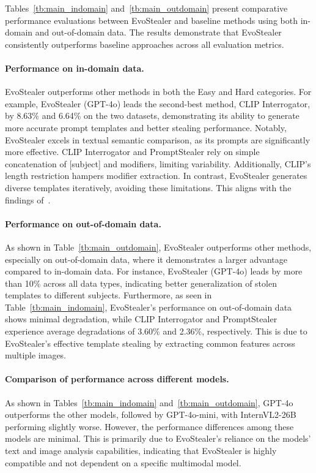 Tables~\ref{tb:main_indomain} and~\ref{tb:main_outdomain} present comparative performance evaluations between EvoStealer and baseline methods using both in-domain and out-of-domain data. The results demonstrate that EvoStealer consistently outperforms baseline approaches across all evaluation metrics.

\paragraph{Performance on in-domain data.} EvoStealer outperforms other methods in both the Easy and Hard categories. For example, EvoStealer (GPT-4o) leads the second-best method, CLIP Interrogator, by 8.63\% and 6.64\% on the two datasets, demonstrating its ability to generate more accurate prompt templates and better stealing performance. Notably, EvoStealer excels in textual semantic comparison, as its prompts are significantly more effective. CLIP Interrogator and PromptStealer rely on simple concatenation of [subject] and modifiers, limiting variability. Additionally, CLIP’s length restriction hampers modifier extraction. In contrast, EvoStealer generates diverse templates iteratively, avoiding these limitations. This aligns with the findings of~\citet{naseh2024iteratively}.

\paragraph{Performance on out-of-domain data.} As shown in Table~\ref{tb:main_outdomain}, EvoStealer outperforms other methods, especially on out-of-domain data, where it demonstrates a larger advantage compared to in-domain data. For instance, EvoStealer (GPT-4o) leads by more than 10\% across all data types, indicating better generalization of stolen templates to different subjects. Furthermore, as seen in Table~\ref{tb:main_indomain}, EvoStealer's performance on out-of-domain data shows minimal degradation, while CLIP Interrogator and PromptStealer experience average degradations of 3.60\% and 2.36\%, respectively. This is due to EvoStealer’s effective template stealing by extracting common features across multiple images.

\paragraph{Comparison of performance across different models.} As shown in Tables~\ref{tb:main_indomain} and~\ref{tb:main_outdomain}, GPT-4o outperforms the other models, followed by GPT-4o-mini, with InternVL2-26B performing slightly worse. However, the performance differences among these models are minimal. This is primarily due to EvoStealer's reliance on the models' text and image analysis capabilities, indicating that EvoStealer is highly compatible and not dependent on a specific multimodal model.